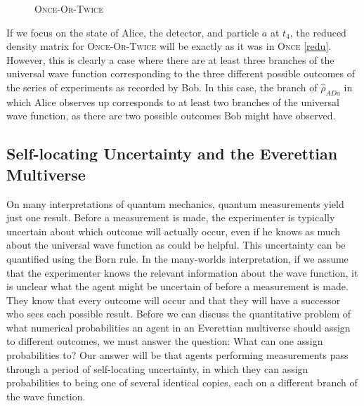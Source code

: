 \documentclass[onecolumn,secnumarabic,amsmath,amssymb,balancelastpage,nofootinbib]{article}
\begin{document}
\begin{figure}[htb]
\caption{\textsc{Once-Or-Twice}}
\label{case1}
\end{figure}

If we focus on the state of Alice, the detector, and particle $a$ at $t_4$, the reduced density matrix for \textsc{Once-Or-Twice} will be exactly as it was in \textsc{Once} \eqref{redu}.  However, this is clearly a case where there are at least three branches of the universal wave function corresponding to the three different possible outcomes of the series of experiments as recorded by Bob.  In this case, the branch of $\widehat{\rho}_{ADa}$ in which Alice observes up corresponds to at least two branches of the universal wave function, as there are two possible outcomes Bob might have observed.

\subsection{Self-locating Uncertainty and the Everettian Multiverse}\label{sluEM}

On many interpretations of quantum mechanics, quantum measurements yield just one result.  Before a measurement is made, the experimenter is typically uncertain about which outcome will actually occur, even if he knows as much about the universal wave function as could be helpful.  This uncertainty can be quantified using the Born rule.  In the many-worlds interpretation, if we assume that the experimenter knows the relevant information about the wave function, it is unclear what the agent might be uncertain of before a measurement is made.  They know that every outcome will occur and that they will have a successor who sees each possible result.  Before we can discuss the quantitative problem of what numerical probabilities an agent in an Everettian multiverse should assign to different outcomes, we must answer the question: What can one assign probabilities to? Our answer will be that agents performing measurements pass through a period of self-locating uncertainty, in which they can assign probabilities to being one of several identical copies, each on a different branch of the wave function.
\end{document}
